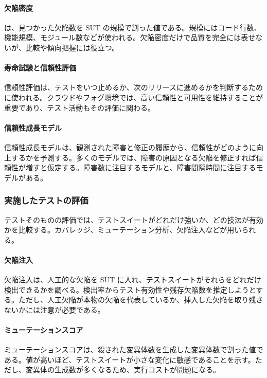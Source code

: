 \documentclass[a4paper,11pt]{ltjsarticle}
\numberwithin{figure}{section}
\numberwithin{table}{section}
\begin{document}
\paragraph{欠陥密度}
は、見つかった欠陥数を SUT の規模で割った値である。規模にはコード行数、機能規模、モジュール数などが使われる。欠陥密度だけで品質を完全には表せないが、比較や傾向把握には役立つ。

\paragraph{寿命試験と信頼性評価}
信頼性評価は、テストをいつ止めるか、次のリリースに進めるかを判断するために使われる。クラウドやフォグ環境では、高い信頼性と可用性を維持することが重要であり、テスト活動もその評価に関わる。

\paragraph{信頼性成長モデル}
信頼性成長モデルは、観測された障害と修正の履歴から、信頼性がどのように向上するかを予測する。多くのモデルでは、障害の原因となる欠陥を修正すれば信頼性が増すと仮定する。障害数に注目するモデルと、障害間隔時間に注目するモデルがある。

\subsubsection{実施したテストの評価}
テストそのものの評価では、テストスイートがどれだけ強いか、どの技法が有効かを比較する。カバレッジ、ミューテーション分析、欠陥注入などが用いられる。

\paragraph{欠陥注入}
欠陥注入は、人工的な欠陥を SUT に入れ、テストスイートがそれらをどれだけ検出できるかを調べる。検出率からテスト有効性や残存欠陥数を推定しようとする。ただし、人工欠陥が本物の欠陥を代表しているか、挿入した欠陥を取り残さないかには注意が必要である。

\paragraph{ミューテーションスコア}
ミューテーションスコアは、殺された変異体数を生成した変異体数で割った値である。値が高いほど、テストスイートが小さな変化に敏感であることを示す。ただし、変異体の生成数が多くなるため、実行コストが問題になる。
\end{document}
